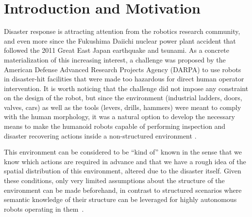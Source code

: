 \section{Introduction and Motivation}
	\label{sec:introduction}

	Disaster response is attracting attention from the robotics research community, and even more since the
	Fukushima Daiichi nuclear power plant accident that followed the 2011 Great East Japan earthquake and tsunami.
	As a concrete materialization of this increasing interest, a challenge was proposed by the American Defense
	Advanced Research Projects Agency (DARPA) to use robots in disaster-hit facilities that were made too hazardous
	for direct human operator intervention.
	It is worth noticing that the challenge did not impose any constraint on the design of the robot, but since the
	environment (industrial ladders, doors, valves, cars) as well as the tools (levers, drills, hammers) were meant
	to comply with the human morphology, it was a natural option to develop the necessary means to make the humanoid
	robots capable of performing inspection and disaster recovering actions inside a non-structured environment
	\cite{Bouyarmane}.
	
	This environment can be considered to be ``kind of'' known in the sense that we know which actions
	are required in advance and that we have a rough idea of the spatial distribution of this environment,
	altered due to the disaster itself.
	Given these conditions, only very limited assumptions about the structure of the environment can
	be made beforehand, in contrast to structured scenarios where semantic knowledge of their structure
	can be leveraged for highly autonomous robots operating in them~\cite{Kohlbrecher}.
	
